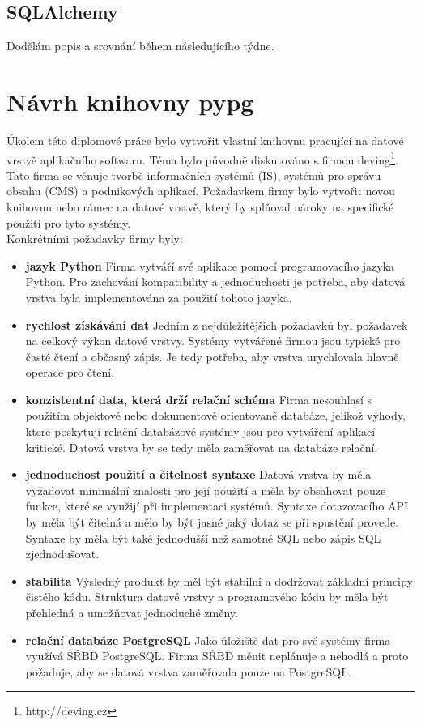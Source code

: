 \documentclass[ing,male,java,dept456]{diploma}						%
\begin{document}
\clearpage
\subsection{SQLAlchemy}
Dodělám popis a srovnání během následujícího týdne.
%

\section{Návrh knihovny pypg}
\label{sec:Design}

Úkolem této diplomové práce bylo vytvořit vlastní knihovnu pracující na datové vrstvě aplikačního softwaru. Téma bylo původně diskutováno s firmou deving\footnote{http://deving.cz}. Tato firma se věnuje tvorbě informačních systémů (IS), systémů pro správu obsahu (CMS) a podnikových aplikací. Požadavkem firmy bylo vytvořit novou knihovnu nebo rámec na datové vrstvě, který by splňoval nároky na specifické použití pro tyto systémy. \\
Konkrétními požadavky firmy byly:
\begin{itemize}
\item \textbf{jazyk Python} Firma vytváří své aplikace pomocí programovacího jazyka Python. Pro zachování kompatibility a jednoduchosti je potřeba, aby datová vrstva byla implementována za použití tohoto jazyka.
\item \textbf{rychlost získávání dat} Jedním z nejdůležitějších požadavků byl požadavek na celkový výkon datové vrstvy. Systémy vytvářené firmou jsou typické pro časté čtení a občasný zápis. Je tedy potřeba, aby vrstva urychlovala hlavně operace pro čtení. 
\item \textbf{konzistentní data, která drží relační schéma} Firma nesouhlasí s použitím objektové nebo dokumentově orientované databáze, jelikož výhody, které poskytují relační databázové systémy jsou pro vytváření aplikací kritické. Datová vrstva by se tedy měla zaměřovat na databáze relační.
\item \textbf{jednoduchost použití a čitelnost syntaxe} Datová vrstva by měla vyžadovat minimální znalosti pro její použití a měla by obsahovat pouze funkce, které se využijí při implementaci systémů. Syntaxe dotazovacího API by měla být čitelná a mělo by být jasné jaký dotaz se při spustění provede. Syntaxe by měla být také jednodušší než samotné SQL nebo zápis SQL zjednodušovat.
\item \textbf{stabilita} Výsledný produkt by měl být stabilní a dodržovat základní principy čistého kódu. Struktura datové vrstvy a programového kódu by měla být přehledná a umožňovat jednoduché změny.
\item \textbf{relační databáze PostgreSQL} Jako úložiště dat pro své systémy firma využívá SŘBD PostgreSQL. Firma SŘBD měnit neplánuje a nehodlá a proto požaduje, aby se datová vrstva zaměřovala pouze na PostgreSQL.
\end{itemize}
\end{document}
